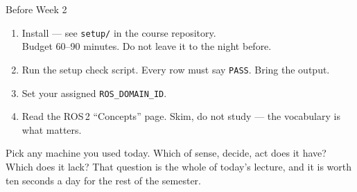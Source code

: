 \documentclass[aspectratio=169]{beamer}
\begin{document}
\begin{frame}{Before Week 2}
  \begin{enumerate}
    \item Install \rosver{} --- see \texttt{setup/} in the course repository. \\
          {\footnotesize Budget 60--90 minutes. Do not leave it to the night before.}
    \item Run the setup check script. Every row must say \texttt{PASS}. Bring the output.
    \item Set your assigned \texttt{ROS\_DOMAIN\_ID}.
    \item Read the ROS\,2 ``Concepts'' page. Skim, do not study --- the vocabulary is what
          matters.
  \end{enumerate}

  \vspace{1.0em}
  \begin{inthefield}
    \footnotesize
    Pick any machine you used today. Which of sense, decide, act does it have? Which does it
    lack? That question is the whole of today's lecture, and it is worth ten seconds a day
    for the rest of the semester.
  \end{inthefield}
\end{frame}
\end{document}
